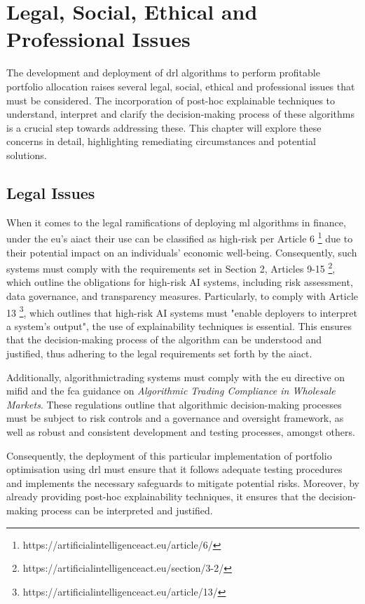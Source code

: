 \chapter{Legal, Social, Ethical and Professional Issues} \label{ch:issues}

The development and deployment of \acrfull{drl} algorithms to perform profitable portfolio allocation raises several legal, social, ethical and professional issues that must be considered. The incorporation of post-hoc explainable techniques to understand, interpret and clarify the decision-making process of these algorithms is a crucial step towards addressing these. This chapter will explore these concerns in detail, highlighting remediating circumstances and potential solutions.

\section{Legal Issues} \label{sec:legal-issues}

When it comes to the legal ramifications of deploying \acrfull{ml} algorithms in finance, under the \acrfull{eu}'s \acrfull{aiact} \cite{AIAct2024} their use can be classified as high-risk per Article 6 \footnote{https://artificialintelligenceact.eu/article/6/} due to their potential impact on an individuals' economic well-being. Consequently, such systems must comply with the requirements set in Section 2, Articles 9-15 \footnote{https://artificialintelligenceact.eu/section/3-2/}, which outline the obligations for high-risk AI systems, including risk assessment, data governance, and transparency measures. Particularly, to comply with Article 13 \footnote{https://artificialintelligenceact.eu/article/13/}, which outlines that high-risk AI systems must "enable deployers to interpret a system's output", the use of explainability techniques is essential. This ensures that the decision-making process of the algorithm can be understood and justified, thus adhering to the legal requirements set forth by the \acrshort{aiact}.

Additionally, \Gls{algorithmictrading} systems must comply with the \acrlong{eu} directive on \acrfull{mifid} \cite{MiFIDII} and the \acrfull{fca} guidance on \textit{Algorithmic Trading Compliance in Wholesale Markets}. These regulations outline that algorithmic decision-making processes must be subject to risk controls and a governance and oversight framework, as well as robust and consistent development and testing processes, amongst others. 

Consequently, the deployment of this particular implementation of portfolio optimisation using \acrfull{drl} must ensure that it follows adequate testing procedures and implements the necessary safeguards to mitigate potential risks. Moreover, by already providing post-hoc explainability techniques, it ensures that the decision-making process can be interpreted and justified. 

